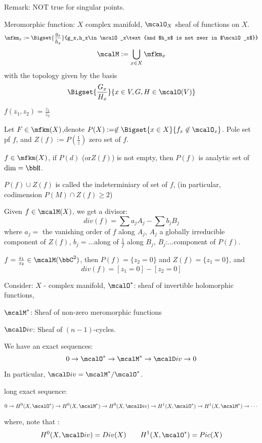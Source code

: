 Remark: NOT true for singular points.

Meromorphic function: $X$ complex manifold, $\mcalO_X$
sheaf of functions on $X$.
$$\mfkm_x:=\Bigset{\frac{g_x}{h_x}}
{g_x,h_x\in\mcalO_x\text{and $h_x$ is not zeor in $\mcalO_x$}}$$
$$
  \mcalM:=\bigcup_{x\in X}\mfkm_x
$$
  with the topology given by the basis
$$
  \Bigset{\frac{G_x}{H_x}}
  {x\in V, G,H\in\mcalO(V)}
$$

\begin{example}
$f(z_1,z_2)=\frac{z_1}{z_2}$
\end{example}

\begin{definition}
Let $F\in\mfkm(X)$,denote 
$P(X):=\not\in \Bigset{x\in X}{f_x\not\in\mcalO_x}$.
Pole set pf $f$, and 
$Z(f):=P(\frac{1}{z})$ zero set of $f$.
\end{definition}

\begin{thm}
$f\in\mfkm(X)$, if $P(d)$ (or$Z(f)$) is not empty,
then $P(f)$ is analytic set of $\dim=\bbH$.
\end{thm}

\begin{definition}
$P(f)\cup Z(f)$ is called the indeterminiary of set of $f$,
(in particular, codimension $P(M)\cap Z(f)\geq 2$) 
\end{definition}

\begin{prop}
Given $f\in\mcalM(X)$, we get a divisor:
$$div(f)=\sum a_jA_j-\sum b_jB_j$$
where $a_j=$ the vanishing order of $f$ along $A_j$,
$A_j$ a globally irreducible component of $Z(f)$,
$b_j=$...along of $\frac{1}{f}$ along $B_j$,
$B_j$:...component of $P(f)$. 
\end{prop}

\begin{example}
$f=\frac{z_1}{z_2}\in\mcalM(\bbC^2)$, then
$P(f)=\{z_2=0\}$ and $Z(f)=\{z_1=0\}$, and 
$$div(f)=[z_1=0]-[z_2=0]$$
\end{example}

Consider: $X$ - complex manifold, $\mcalO^*$:
sheaf of invertible holomorphic functions,

$\mcalM^*$: Sheaf of non-zero meromorphic functions

$\mcalD iv$: Sheaf of $(n-1)$-cycles.

\begin{prop}
We have an exact sequences:
$$0\to\mcalO^*\to\mcalM^*\to\mcalD iv\to 0$$

In particular, $\mcalD iv=\mcalM^*/\mcalO^*$.

long exact sequence:

$$0\to H^0(X,\mcalO^*)\to H^0(X,\mcalM^*)\to H^0(X,\mcalD iv)
\to H^1(X,\mcalO^*)\to H^1(X,\mcalM^*)\to\cdots$$
\end{prop}
where, note that :
$$H^0(X,\mcalD iv)=Div(X)\qquad H^1(X,\mcalO^*)=Pic(X)$$



